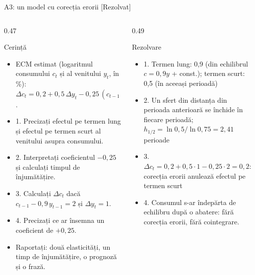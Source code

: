 \begin{frame}{A3: un model cu corecția erorii [Rezolvat]}
\itemsize{\scriptsize}
\begin{columns}[T]
\begin{column}{0.47\textwidth}
\begin{block}{Cerință}
\begin{itemize}
    \item ECM estimat (logaritmul consumului $c_t$ și al venitului $y_t$, în \%): $\Delta c_t = 0{,}2 + 0{,}5\,\Delta y_t - 0{,}25\,(c_{t-1} - 0{,}9\,y_{t-1})$.
    \item 1. Precizați efectul pe termen lung și efectul pe termen scurt al venitului asupra consumului.
    \item 2. Interpretați coeficientul $-0{,}25$ și calculați timpul de înjumătățire.
    \item 3. Calculați $\Delta c_t$ dacă $c_{t-1} - 0{,}9\,y_{t-1} = 2$ și $\Delta y_t = 1$.
    \item 4. Precizați ce ar însemna un coeficient de $+0{,}25$.
    \item Raportați: două elasticități, un timp de înjumătățire, o prognoză și o frază.
\end{itemize}
\end{block}
\end{column}
\begin{column}{0.49\textwidth}
\begin{exampleblock}{Rezolvare}
\begin{itemize}
    \item 1. Termen lung: 0,9 (din echilibrul $c = 0{,}9y$ + const.); termen scurt: 0,5 (în aceeași perioadă)
    \item 2. Un sfert din distanța din perioada anterioară se închide în fiecare perioadă; $h_{1/2} = \ln 0{,}5/\ln 0{,}75 = 2{,}41$ perioade
    \item 3. $\Delta c_t = 0{,}2 + 0{,}5 \cdot 1 - 0{,}25 \cdot 2 = 0{,}2$: corecția erorii anulează efectul pe termen scurt
    \item 4. Consumul s-ar îndepărta de echilibru după o abatere: fără corecția erorii, fără cointegrare.
\end{itemize}
\end{exampleblock}
\end{column}
\end{columns}
\end{frame}

